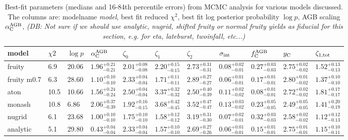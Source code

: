 \documentclass[fleqn,
usenatbib]{mnras}
\newcommand{\Yct}{{y_{\rm C}}}
\newcommand{\aagb}{\alpha_{\rm C}^{\rm AGB}}
\newcommand{\fagb}{f_{\rm C}^{\rm AGB}}
\newcommand{\zetao}{\zeta_0}
\newcommand{\zetai}{\zeta_{1}}
\newcommand{\zetaii}{\zeta_{2}}
\newcommand{\dbnote}[1]{ {\color{Thistle} \textit{\small (DB: #1)}} }
\begin{document}
\begin{table}


    \caption{
    Best-fit parameters (medians and 16-84th percentile errors) from MCMC analysis for various models discussed.
    The columns are:  modelname \textit{model}, best fit reduced $\chi^2$, best fit log posterior probability $\log p$, AGB scaling $\aagb$, 
    \dbnote{Not sure if we should use analytic, nugrid, shifted fruity or normal fruity yields as fiducial for this section, e.g. for eta, lateburst, twoinfall, etc...}}
    \label{tab:mcmc_results}
{ 
\renewcommand{\baselinestretch}{1.2}
    \begin{tabular}{l l l l l l l l l l l} 
    \hline
    model            & $\chi2$  & $\log p$ & $\aagb$ & $\zetao$ & $\zetai$ & $\zetaii$ & $\sigma_{\rm int}$ & $\fagb$ & $\Yct$ & $\zeta_{\rm 1, tot}$\\
\hline
fruity           &      6.9 &    20.06 & $1.96^{+0.21}_{-0.21}$  &  $2.01^{+0.08}_{-0.08}$  &  $2.20^{+0.15}_{-0.15}$  &  $2.73^{+0.31}_{-0.31}$  &  $0.08^{+0.02}_{-0.01}$  &  $0.27^{+0.03}_{-0.03}$  &  $2.75^{+0.02}_{-0.02}$  &  $1.52^{+0.13}_{-0.13}$\\ 
fruity m0.7      &      6.3 &    28.60 & $1.10^{+0.10}_{-0.10}$  &  $2.33^{+0.04}_{-0.04}$  &  $1.71^{+0.11}_{-0.11}$  &  $2.89^{+0.27}_{-0.27}$  &  $0.06^{+0.01}_{-0.01}$  &  $0.17^{+0.01}_{-0.01}$  &  $2.80^{+0.01}_{-0.02}$  &  $1.37^{+0.10}_{-0.10}$\\ 
aton             &     10.5 &    10.66 & $1.56^{+0.24}_{-0.24}$  &  $2.50^{+0.04}_{-0.04}$  &  $3.37^{+0.32}_{-0.32}$  &  $2.50^{+0.40}_{-0.39}$  &  $0.11^{+0.02}_{-0.02}$  &  $0.08^{+0.01}_{-0.01}$  &  $2.72^{+0.02}_{-0.02}$  &  $1.81^{+0.17}_{-0.17}$\\ 
monash           &     10.8 &     6.86 & $2.06^{+0.37}_{-0.39}$  &  $1.92^{+0.16}_{-0.15}$  &  $3.68^{+0.42}_{-0.45}$  &  $3.52^{+0.47}_{-0.47}$  &  $0.13^{+0.03}_{-0.02}$  &  $0.23^{+0.05}_{-0.05}$  &  $2.49^{+0.05}_{-0.05}$  &  $1.41^{+0.20}_{-0.19}$\\ 
nugrid           &      6.1 &    23.68 & $1.00^{+0.10}_{-0.10}$  &  $1.75^{+0.10}_{-0.10}$  &  $1.58^{+0.12}_{-0.12}$  &  $3.19^{+0.31}_{-0.30}$  &  $0.07^{+0.02}_{-0.01}$  &  $0.32^{+0.03}_{-0.03}$  &  $2.58^{+0.02}_{-0.02}$  &  $1.12^{+0.12}_{-0.13}$\\ 
analytic         &      5.1 &    29.80 & $0.43^{+0.04}_{-0.04}$  &  $2.33^{+0.04}_{-0.04}$  &  $1.57^{+0.10}_{-0.10}$  &  $2.69^{+0.27}_{-0.26}$  &  $0.06^{+0.01}_{-0.01}$  &  $0.15^{+0.01}_{-0.01}$  &  $2.75^{+0.01}_{-0.01}$  &  $1.15^{+0.10}_{-0.11}$\\ 

\end{tabular}}
\end{table}
\end{document}
